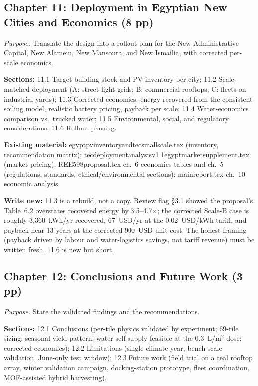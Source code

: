 \documentclass[11pt,a4paper]{article}
\newcommand{\f}[1]{{\ttfamily\def\_{\textunderscore\allowbreak}#1}}
\begin{document}
\subsection{Chapter 11: Deployment in Egyptian New Cities and Economics (8 pp)}
\textit{Purpose.} Translate the design into a rollout plan for the New
Administrative Capital, New Alamein, New Mansoura, and New Ismailia, with
corrected per-scale economics.

\textbf{Sections:} 11.1 Target building stock and PV inventory per city; 11.2
Scale-matched deployment (A: street-light grids; B: commercial rooftops; C:
fleets on industrial yards); 11.3 Corrected economics: energy recovered from
the consistent soiling model, realistic battery pricing, payback per scale;
11.4 Water-economics comparison vs.\ trucked water; 11.5 Environmental, social,
and regulatory considerations; 11.6 Rollout phasing.

\textbf{Existing material:} \f{egypt\_pv\_inventory\_and\_tec\_small\_scale.tex}
(inventory, recommendation matrix);
\f{tec\_deployment\_analysis\_v1.1\_egypt\_market\_supplement.tex} (market
pricing); \f{REE598\_proposal.tex} ch.~6 economics tables and ch.~5
(regulations, standards, ethical/environmental sections);
\f{main\_report.tex} ch.~10 economic analysis.

\textbf{Write new:} 11.3 is a rebuild, not a copy. Review flag \S3.1 showed the
proposal's Table~6.2 overstates recovered energy by 3.5--4.7$\times$; the
corrected Scale-B case is roughly 3{,}360~kWh/yr recovered, 67~USD/yr at the
0.02~USD/kWh tariff, and payback near 13 years at the corrected 900~USD unit
cost. The honest framing (payback driven by labour and water-logistics savings,
not tariff revenue) must be written fresh. 11.6 is new but short.

\subsection{Chapter 12: Conclusions and Future Work (3 pp)}
\textit{Purpose.} State the validated findings and the recommendations.

\textbf{Sections:} 12.1 Conclusions (per-tile physics validated by experiment;
69-tile sizing; seasonal yield pattern; water self-supply feasible at the
0.3~L/m$^2$ dose; corrected economics); 12.2 Limitations (single climate year,
bench-scale
validation, June-only test window); 12.3 Future work (field trial on a real
rooftop array, winter validation campaign, docking-station prototype, fleet
coordination, MOF-assisted hybrid harvesting).
\end{document}
